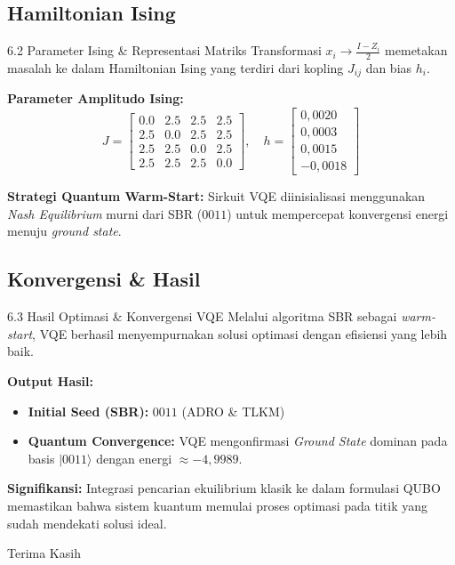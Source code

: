 \subsection{Hamiltonian Ising}
\begin{frame}{6.2 Parameter Ising & Representasi Matriks}
Transformasi $x_i \to \frac{I - Z_i}{2}$ memetakan masalah ke dalam Hamiltonian Ising yang terdiri dari kopling $J_{ij}$ dan bias $h_i$.

\textbf{Parameter Amplitudo Ising:}
\begin{equation}
J = 
\begin{bmatrix}
0.0 & 2.5 & 2.5 & 2.5 \\
2.5 & 0.0 & 2.5 & 2.5 \\
2.5 & 2.5 & 0.0 & 2.5 \\
2.5 & 2.5 & 2.5 & 0.0
\end{bmatrix}
, \quad h = 
\begin{bmatrix}
0,0020 \\ 0,0003 \\ 0,0015 \\ -0,0018
\end{bmatrix}
\end{equation}

\textbf{Strategi Quantum Warm-Start:}
Sirkuit VQE diinisialisasi menggunakan \textit{Nash Equilibrium} murni dari SBR ($0011$) untuk mempercepat konvergensi energi menuju \textit{ground state}.
\end{frame}

\subsection{Konvergensi & Hasil}
\begin{frame}{6.3 Hasil Optimasi & Konvergensi VQE}
Melalui algoritma SBR sebagai \textit{warm-start}, VQE berhasil menyempurnakan solusi optimasi dengan efisiensi yang lebih baik.

\textbf{Output Hasil:}
\begin{itemize}
    \item \textbf{Initial Seed (SBR):} $0011$ (ADRO \& TLKM)
    \item \textbf{Quantum Convergence:} VQE mengonfirmasi \textit{Ground State} dominan pada basis $|0011\rangle$ dengan energi $\approx -4,9989$.
\end{itemize}

\vspace{0.2cm}
\textbf{Signifikansi:} Integrasi pencarian ekuilibrium klasik ke dalam formulasi QUBO memastikan bahwa sistem kuantum memulai proses optimasi pada titik yang sudah mendekati solusi ideal.
\end{frame}

\begin{frame}
\centering \Huge
Terima Kasih
\end{frame}
